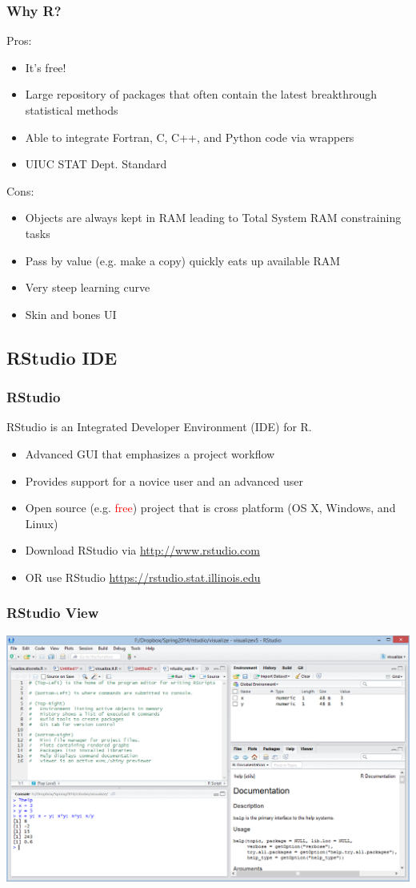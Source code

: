 \documentclass{beamer}\usepackage[]{graphicx}\usepackage[]{color}
\begin{document}
\begin{frame}
\frametitle{Why R?}
Pros:
\begin{itemize}
\item It's free!
\item Large repository of packages that often contain the latest breakthrough statistical methods
\item Able to integrate Fortran, C, C++, and Python code via wrappers
\item UIUC STAT Dept. Standard
\end{itemize}
Cons:
\begin{itemize}
\item Objects are always kept in RAM leading to Total System RAM constraining tasks
\item Pass by value (e.g. make a copy) quickly eats up available RAM
\item Very steep learning curve
\item Skin and bones UI
\end{itemize}
\end{frame}

\subsection{RStudio IDE}
\begin{frame}
\frametitle{RStudio}
RStudio is an Integrated Developer Environment (IDE) for R. 
\begin{itemize}
\item Advanced GUI that emphasizes a project workflow
\item Provides support for a novice user and an advanced user
\item Open source (e.g. \textcolor{red}{free}) project that is cross platform (OS X, Windows, and Linux)
\item Download RStudio via \href{http://www.rstudio.com/products/rstudio/download/}{http://www.rstudio.com}
\item OR use RStudio \url{https://rstudio.stat.illinois.edu}
\end{itemize}
\end{frame}

\begin{frame}
\frametitle{RStudio View}
\begin{center}
\includegraphics[scale=0.38]{rstudio_view.png}
\end{center}

\end{frame}
\end{document}
